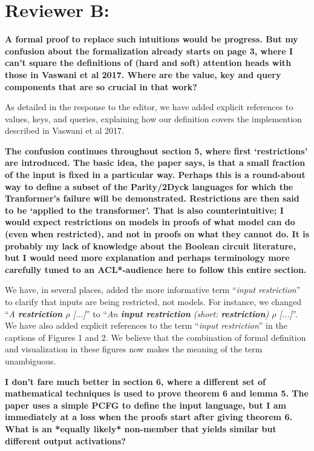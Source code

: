 \documentclass[11pt,a4paper]{article}
\newcounter{theorem}
\newcommand{\key}[1]{\textbf{#1}}
\newcommand\response[1]{{\color{blue}#1}}
\newcommand\newtext[1]{``\textit{#1}''}
\newcommand\original[1]{\textbf{#1}}
\begin{document}
\section{Reviewer B:}


\original{A formal proof to replace such intuitions would be progress. But my
confusion about the formalization already starts on page 3, where I can’t
square the definitions of (hard and soft) attention heads with those in
Vaswani et al 2017. Where are the value, key and query components that are
so crucial in that work?}

\response{As detailed in the response to the editor, we have added explicit references to values, keys, and queries, explaining how our definition covers the implemention described in Vaswani et al 2017.}

\original{The confusion continues throughout section 5, where first ‘restrictions’
are introduced. The basic idea, the paper says, is that a small fraction of
the input is fixed in a particular way. Perhaps this is a round-about way to
define a subset of the Parity/2Dyck languages for which the Tranformer’s
failure will be demonstrated. Restrictions are then said to be ‘applied to
the transformer’. That is also counterintuitive; I would expect
restrictions on models in proofs of what model can do (even when
restricted), and not in proofs on what they cannot do. It is probably my
lack of knowledge about the Boolean circuit literature, but I would need
more explanation and perhaps terminology more carefully tuned to an
ACL*-audience here to follow this entire section.}

\response{We have, in several places, added the more informative term \newtext{input restriction} to clarify that inputs are being restricted, not models. For instance, we changed \newtext{A \key{restriction} $\rho$ [...]} to \newtext{An \key{input restriction} (short: \key{restriction}) $\rho$ [...]}. We have also added explicit references to the term \newtext{input restriction} in the captions of Figures 1 and 2. We believe that the combination of formal definition and visualization in these figures now makes the meaning of the term unambiguous.}

\original{I don’t fare much better in section 6, where a different set of
mathematical techniques is used to prove theorem 6 and lemma 5. The paper
uses a simple PCFG to define the input language, but I am immediately at a
loss when the proofs start after giving theorem 6. What is an *equally
likely* non-member that yields similar but different output activations?}
\end{document}
